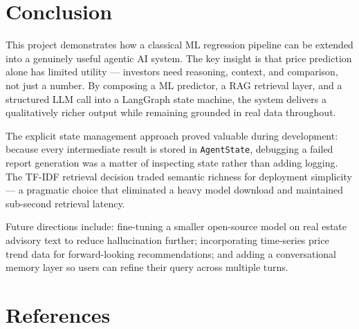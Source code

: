 \documentclass[12pt, a4paper]{article}
\begin{document}
\section{Conclusion}

This project demonstrates how a classical ML regression pipeline can be extended
into a genuinely useful agentic AI system. The key insight is that price prediction
alone has limited utility --- investors need reasoning, context, and comparison, not
just a number. By composing a ML predictor, a RAG retrieval layer, and a structured
LLM call into a LangGraph state machine, the system delivers a qualitatively richer
output while remaining grounded in real data throughout.

The explicit state management approach proved valuable during development: because
every intermediate result is stored in \texttt{AgentState}, debugging a failed report
generation was a matter of inspecting state rather than adding logging. The TF-IDF
retrieval decision traded semantic richness for deployment simplicity --- a pragmatic
choice that eliminated a heavy model download and maintained sub-second retrieval
latency.

Future directions include: fine-tuning a smaller open-source model on real estate
advisory text to reduce hallucination further; incorporating time-series price
trend data for forward-looking recommendations; and adding a conversational memory
layer so users can refine their query across multiple turns.

\section*{References}
\end{document}
